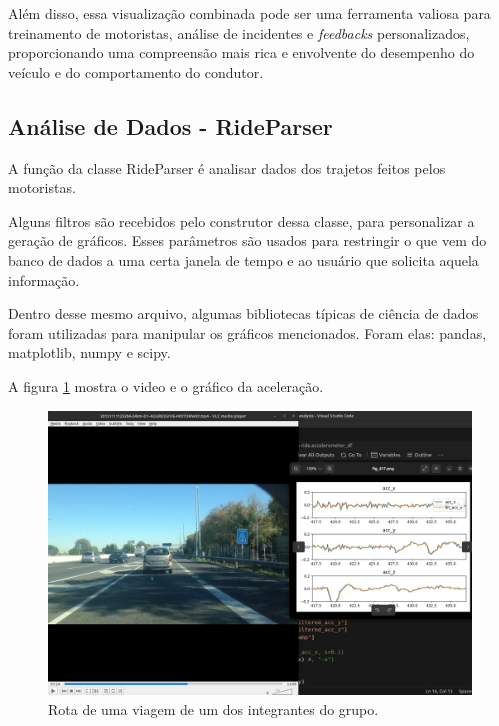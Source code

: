     Além disso, essa visualização combinada pode ser uma ferramenta valiosa para treinamento de motoristas, análise de incidentes e \textit{feedbacks} personalizados, proporcionando uma compreensão mais rica e envolvente do desempenho do veículo e do comportamento do condutor.

    \subsection{Análise de Dados - RideParser}\label{rideparser}

    A função da classe RideParser é analisar dados dos trajetos feitos pelos motoristas. 
    
    Alguns filtros são recebidos pelo construtor dessa classe, para personalizar a geração de gráficos. Esses parâmetros são usados para restringir o que vem do banco de dados a uma certa janela de tempo e ao usuário que solicita aquela informação.
    
    Dentro desse mesmo arquivo, algumas bibliotecas típicas de ciência de dados foram utilizadas para manipular os gráficos mencionados. Foram elas: pandas, matplotlib, numpy e scipy.
    
    A figura \ref{fig:rota1integrante} mostra o video e o gráfico da aceleração.
    
    \begin{figure}[hp]
        \centering
        
        \includegraphics[scale=0.3]{figures/rota_integrante.jpg}
        
        \caption{Rota de uma viagem de um dos integrantes do grupo.}
        \label{fig:rota1integrante}
    \end{figure}

